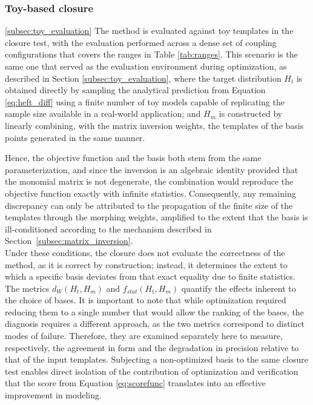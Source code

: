 \subsubsection{Toy-based closure}
\ref{subsec:toy_evaluation}
The method is evaluated against toy templates in the closure test, with the evaluation performed across a dense set of coupling configurations that covers the ranges in Table \ref{tab:ranges}. This scenario is the same one that served as the evaluation environment during optimization, as described in Section \ref{subsec:toy_evaluation}, where the target distribution $H_t$ is obtained directly by sampling the analytical prediction from Equation \ref{eq:heft_diff} using a finite number of toy models capable of replicating the sample size available in a real-world application; and $H_m$ is constructed by linearly combining, with the matrix inversion weights, the templates of the basis points generated in the same manner.

Hence, the objective function and the basis both stem from the same parameterization, and since the inversion is an algebraic identity provided that the monomial matrix is not degenerate, the combination would reproduce the objective function exactly with infinite statistics. Consequently, any remaining discrepancy can only be attributed to the propagation of the finite size of the templates through the morphing weights, amplified to the extent that the basis is ill-conditioned according to the mechanism described in Section~\ref{subsec:matrix_inversion}.\\

Under these conditions, the closure does not evaluate the correctness of the method, as it is correct by construction; instead, it determines the extent to which a specific basis deviates from that exact equality due to finite statistics. The metrics $d_W(H_{t},H_{m})$ and $f_{stat}(H_{t},H_{m})$ quantify the effects inherent to the choice of bases. It is important to note that while optimization required reducing them to a single number that would allow the ranking of the bases, the diagnosis requires a different approach, as the two metrics correspond to distinct modes of failure. Therefore, they are examined separately here to measure, respectively, the agreement in form and the degradation in precision relative to that of the input templates. Subjecting a non-optimized basis to the same closure test enables direct isolation of the contribution of optimization and verification that the score from Equation \ref{eq:scorefunc} translates into an effective improvement in modeling.

